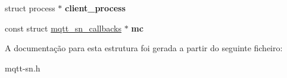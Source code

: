 \begin{DoxyCompactItemize}
\item 
\hypertarget{structmqtt__sn__connection_ae76761094406a6877b87201cab1d60ba}{struct process $\ast$ {\bfseries client\+\_\+process}}\label{structmqtt__sn__connection_ae76761094406a6877b87201cab1d60ba}

\item 
\hypertarget{structmqtt__sn__connection_a8db5a6e4d67db8c3c0db7930cb99285b}{const struct \hyperlink{structmqtt__sn__callbacks}{mqtt\+\_\+sn\+\_\+callbacks} $\ast$ {\bfseries mc}}\label{structmqtt__sn__connection_a8db5a6e4d67db8c3c0db7930cb99285b}

\end{DoxyCompactItemize}


A documentação para esta estrutura foi gerada a partir do seguinte ficheiro\+:\begin{DoxyCompactItemize}
\item 
mqtt-\/sn.\+h\end{DoxyCompactItemize}
